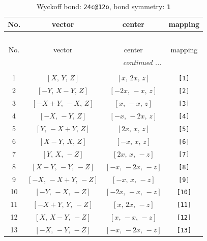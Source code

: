 \documentclass[fleqn,8pt]{jsarticle}
\begin{document}
\begin{longtable}{cccc}
\caption{Wyckoff bond: {\tt 24c@12o}, bond symmetry: {\tt 1}}
 \\
 \hline \hline
No. & vector & center & mapping \\ \hline \endfirsthead

\multicolumn{3}{l}{\tablename\ \thetable{}} \\
 \hline \hline
No. & vector & center & mapping \\ \hline \endhead

 \hline \hline
\multicolumn{3}{r}{\footnotesize\it continued ...} \\ \endfoot

 \hline \hline
\multicolumn{3}{r}{} \\ \endlastfoot

1 & $\left[ X,\, Y,\, Z \right]$ & $\left[ x,\, 2 x,\, z \right]$ & {\tt [1]} \\ \hline
2 & $\left[ - Y,\, X - Y,\, Z \right]$ & $\left[ - 2 x,\, - x,\, z \right]$ & {\tt [2]} \\ \hline
3 & $\left[ - X + Y,\, - X,\, Z \right]$ & $\left[ x,\, - x,\, z \right]$ & {\tt [3]} \\ \hline
4 & $\left[ - X,\, - Y,\, Z \right]$ & $\left[ - x,\, - 2 x,\, z \right]$ & {\tt [4]} \\ \hline
5 & $\left[ Y,\, - X + Y,\, Z \right]$ & $\left[ 2 x,\, x,\, z \right]$ & {\tt [5]} \\ \hline
6 & $\left[ X - Y,\, X,\, Z \right]$ & $\left[ - x,\, x,\, z \right]$ & {\tt [6]} \\ \hline
7 & $\left[ Y,\, X,\, - Z \right]$ & $\left[ 2 x,\, x,\, - z \right]$ & {\tt [7]} \\ \hline
8 & $\left[ X - Y,\, - Y,\, - Z \right]$ & $\left[ - x,\, - 2 x,\, - z \right]$ & {\tt [8]} \\ \hline
9 & $\left[ - X,\, - X + Y,\, - Z \right]$ & $\left[ - x,\, x,\, - z \right]$ & {\tt [9]} \\ \hline
10 & $\left[ - Y,\, - X,\, - Z \right]$ & $\left[ - 2 x,\, - x,\, - z \right]$ & {\tt [10]} \\ \hline
11 & $\left[ - X + Y,\, Y,\, - Z \right]$ & $\left[ x,\, 2 x,\, - z \right]$ & {\tt [11]} \\ \hline
12 & $\left[ X,\, X - Y,\, - Z \right]$ & $\left[ x,\, - x,\, - z \right]$ & {\tt [12]} \\ \hline
13 & $\left[ - X,\, - Y,\, - Z \right]$ & $\left[ - x,\, - 2 x,\, - z \right]$ & {\tt [13]} \\ \hline

\end{longtable}
\end{document}
